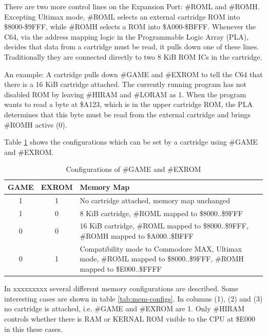 \documentclass[a4paper,oneside]{memoir}
\begin{document}
There are two more control lines on the Expansion Port: \#ROML and
\#ROMH. Excepting Ultimax mode, \#ROML selects an external
cartridge ROM into \$8000-\$9FFF, while \#ROMH selects a ROM into
\$A000-\$BFFF. Whenever the C64, via the address mapping logic in
the Programmable Logic Array (PLA), decides that data from a
cartridge must be read, it pulls down one of these lines.
Traditionally they are connected directly to two 8 KiB ROM ICs in
the cartridge.

An example: A cartridge pulls down \#GAME and \#EXROM to tell the C64
that there is a 16 KiB cartridge attached. The currently running
program has not disabled ROM by leaving \#HIRAM and \#LORAM as 1. When
the program wants to read a byte at \$A123, which is in the upper
cartridge ROM, the PLA determines that this byte must be read from
the external cartridge and brings \#ROMH active (0).

Table \ref {tab:game-exrom} shows the configurations which can be
set by a cartridge using \#GAME and \#EXROM.

\begin{table}
    \centering
    \begin{tabularx}{\textwidth}{ccX}
        \toprule
        GAME & EXROM & Memory Map \\
        \midrule
        1 & 1 & No cartridge attached, memory map unchanged \\[3pt]
        1 & 0 & 8 KiB cartridge, \#ROML mapped to \$8000..\$9FFF \\[3pt]
        0 & 0 & 16 KiB cartridge, \#ROML mapped to \$8000..\$9FFF, \#ROMH mapped to \$A000..\$BFFF \\[3pt]
        0 & 1 & Compatibility mode to Commodore MAX, Ultimax mode,
                \#ROML mapped to \$8000..\$9FFF, \#ROMH mapped to \$E000..\$FFFF \\[3pt]
        \bottomrule
    \end{tabularx}
    \caption{Configurations of \#GAME and \#EXROM}
    \label{tab:game-exrom}
\end{table}

In \cite[Ch.~3]{HS10} xxxxxxxxx several different 
memory configurations are described. Some interesting cases are
shown in table \ref {tab:mem-configs}. In columns (1), (2) and (3) no cartridge is
attached, i.e. \#GAME and \#EXROM are 1. Only \#HIRAM controls
whether there is RAM or KERNAL ROM visible to the CPU at \$E000 in
this these cases.
\end{document}
